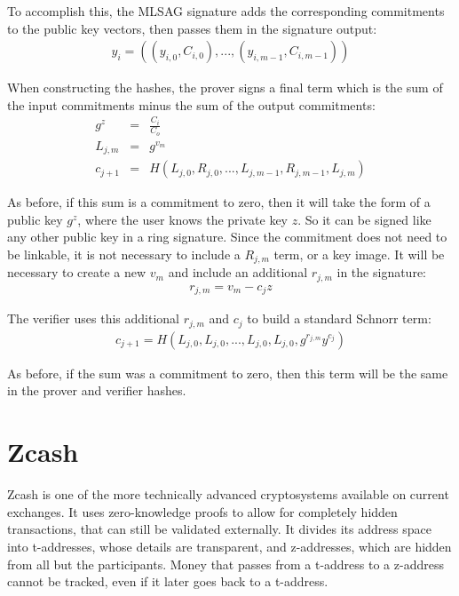 \documentclass{article}
\begin{document}
To accomplish this, the MLSAG signature adds the corresponding commitments to the public key vectors, then passes them in the signature output:
\begin{eqnarray}
  y_i = ((y_{i,0}, C_{i,0}), ..., (y_{i,m-1}, C_{i,m-1}))
\end{eqnarray}

When constructing the hashes, the prover signs a final term which is the sum of the input commitments minus the sum of the output commitments:
\begin{eqnarray}
  g^z &=& \frac{C_i}{C_o}\\
  L_{j,m} &=& g^{v_m}\\
  c_{j+1} &=& H(L_{j,0}, R_{j,0}, ... , L_{j,m-1}, R_{j, m-1}, L_{j,m})
\end{eqnarray}

As before, if this sum is a commitment to zero, then it will take the form of a public key $g^z$, where the user knows the private key $z$.  So it can be signed like any other public key in a ring signature.  Since the commitment does not need to be linkable, it is not necessary to include a $R_{j,m}$ term, or a key image.  It will be necessary to create a new $v_m$ and include an additional $r_{j,m}$ in the signature:
\begin{eqnarray}
  r_{j,m} = v_m - c_j z
\end{eqnarray}

The verifier uses this additional $r_{j,m}$ and $c_j$ to build a standard Schnorr term:
\begin{eqnarray}
  c_{j+1} = H(L_{j,0}, L_{j,0}, ... , L_{j,0}, L_{j,0}, g^{r_{j,m}} y^{c_j})
\end{eqnarray}

As before, if the sum was a commitment to zero, then this term will be the same in the prover and verifier hashes.



\section{Zcash}

Zcash is one of the more technically advanced cryptosystems available on current exchanges.  It uses zero-knowledge proofs to allow for completely hidden transactions, that can still be validated externally.  It divides its address space into t-addresses, whose details are transparent, and z-addresses, which are hidden from all but the participants.  Money that passes from a t-address to a z-address cannot be tracked, even if it later goes back to a t-address.
\end{document}
